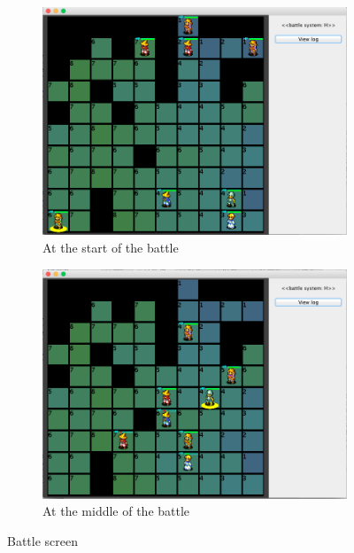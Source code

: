 \begin{figure}
	\centering
	
	\begin{subfigure}{1\textwidth}
		\centering
		\includegraphics[width=.9\linewidth]{figures/gui_start}
		\caption{At the start of the battle}
	\end{subfigure}
	
	\begin{subfigure}{1\textwidth}
		\centering
		\includegraphics[width=.9\linewidth]{figures/gui_midgame}
		\caption{At the middle of the battle}
	\end{subfigure}
	\caption{Battle screen}
	\label{fig:gui3}
\end{figure}

